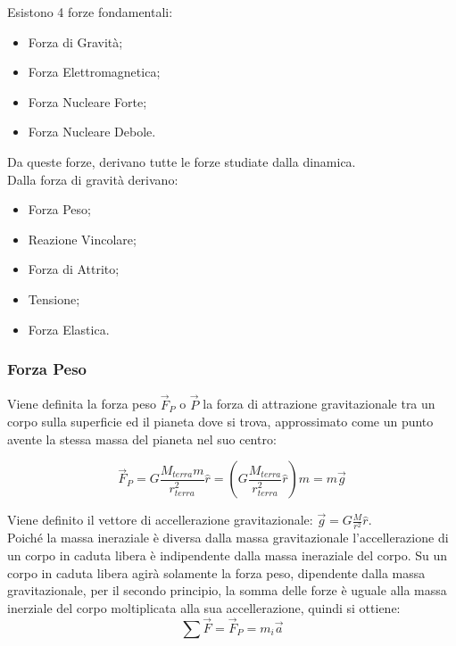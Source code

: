 \documentclass{article}
\numberwithin{equation}{subsection}
\begin{document}
Esistono 4 forze fondamentali:
\begin{itemize}
    \item Forza di Gravità;
    \item Forza Elettromagnetica;
    \item Forza Nucleare Forte;
    \item Forza Nucleare Debole.
\end{itemize}
Da queste forze, derivano tutte le forze studiate dalla 
dinamica.\\
Dalla forza di gravità derivano:

\begin{itemize}
    \item Forza Peso;
    \item Reazione Vincolare;
    \item Forza di Attrito;
    \item Tensione;
    \item Forza Elastica.
\end{itemize}

\subsubsection{Forza Peso}

Viene definita la forza peso $\vec{F}_P$ o $\vec{P}$ la forza di attrazione gravitazionale tra un
corpo sulla superficie ed il pianeta dove si trova, approssimato 
come un punto avente la stessa massa del pianeta nel suo centro:

\begin{equation}
    \vec{F}_P=G\displaystyle\frac{M_{terra}m}{r_{terra}^{2}}\hat{r}=\left(G\frac{M_{terra}}{r_{terra}^{2}}\hat{r}\right)m=m\vec{g}
\end{equation}

Viene definito il vettore di accellerazione gravitazionale: 
$\vec{g}=G\displaystyle\frac{M}{r^{2}}\hat{r}$.
\\
Poiché la massa ineraziale è diversa dalla massa gravitazionale 
l'accellerazione di un corpo in caduta libera è indipendente 
dalla massa ineraziale del corpo. Su un corpo in caduta libera agirà solamente la forza peso, dipendente dalla massa gravitazionale, per il secondo 
principio, la somma delle forze è uguale alla massa inerziale del corpo moltiplicata alla sua accellerazione, quindi si ottiene: 
\begin{equation*}
    \sum\vec{F}=\vec{F}_P=m_i\vec{a}
\end{equation*}
\end{document}
